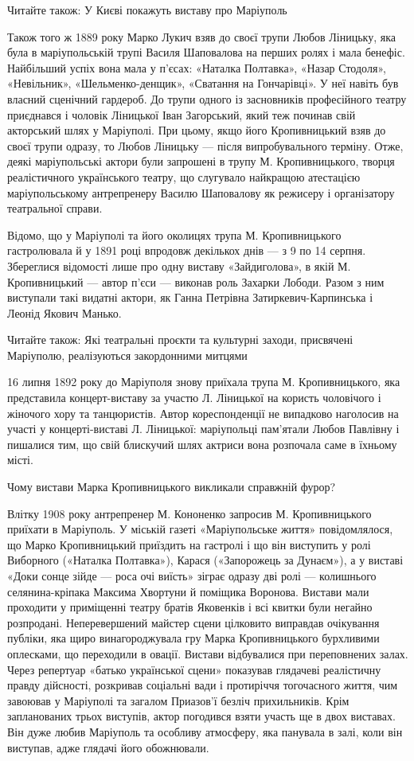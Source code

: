 Читайте також: У Києві покажуть виставу про Маріуполь

Також того ж 1889 року Марко Лукич взяв до своєї трупи Любов Ліницьку, яка була
в маріупольській трупі Василя Шаповалова на перших ролях і мала бенефіс.
Найбільший успіх вона мала у п'єсах: «Наталка Полтавка», «Назар Стодоля»,
«Невільник», «Шельменко-денщик», «Сватання на Гончарівці». У неї навіть був
власний сценічний гардероб. До трупи одного із засновників професійного театру
приєднався і чоловік Ліницької Іван Загорський, який теж починав свій
акторський шлях у Маріуполі. При цьому, якщо його Кропивницький взяв до своєї
трупи одразу, то Любов Ліницьку — після випробувального терміну. Отже, деякі
маріупольські актори були запрошені в трупу М. Кропивницького, творця
реалістичного українського театру, що слугувало найкращою атестацією
маріупольському антрепренеру Василю Шаповалову як режисеру і організатору
театральної справи.

Відомо, що у Маріуполі та його околицях трупа М. Кропивницького гастролювала й
у 1891 році впродовж декількох днів — з 9 по 14 серпня. Збереглися відомості
лише про одну виставу «Зайдиголова», в якій М. Кропивницький — автор п'єси —
виконав роль Захарки Лободи. Разом з ним виступали такі видатні актори, як
Ганна Петрівна Затиркевич-Карпинська і Леонід Якович Манько.

Читайте також: Які театральні проєкти та культурні заходи, присвячені
Маріуполю, реалізуються закордонними митцями

16 липня 1892 року до Маріуполя знову приїхала трупа М. Кропивницького, яка
представила концерт-виставу за участю Л. Ліницької на користь чоловічого і
жіночого хору та танцюристів. Автор кореспонденції не випадково наголосив на
участі у концерті-виставі Л. Ліницької: маріупольці пам'ятали Любов Павлівну і
пишалися тим, що свій блискучий шлях актриси вона розпочала саме в їхньому
місті.

Чому вистави Марка Кропивницького викликали справжній фурор?

Влітку 1908 року антрепренер М. Кононенко запросив М. Кропивницького приїхати в
Маріуполь. У міській газеті «Маріупольське життя» повідомлялося, що Марко
Кропивницький приїздить на гастролі і що він виступить у ролі Виборного
(«Наталка Полтавка»), Карася («Запорожець за Дунаєм»), а у виставі «Доки сонце
зійде — роса очі виїсть» зіграє одразу дві ролі — колишнього селянина-кріпака
Максима Хвортуни й поміщика Воронова. Вистави мали проходити у приміщенні
театру братів Яковенків і всі квитки були негайно розпродані. Неперевершений
майстер сцени цілковито виправдав очікування публіки, яка щиро винагороджувала
гру Марка Кропивницького бурхливими оплесками, що переходили в овації. Вистави
відбувалися при переповнених залах. Через репертуар «батько української сцени»
показував глядачеві реалістичну правду дійсності, розкривав соціальні вади і
протиріччя тогочасного життя, чим завоював у Маріуполі та загалом Приазов'ї
безліч прихильників. Крім запланованих трьох виступів, актор погодився взяти
участь ще в двох виставах. Він дуже любив Маріуполь та особливу атмосферу, яка
панувала в залі, коли він виступав, адже глядачі його обожнювали.

